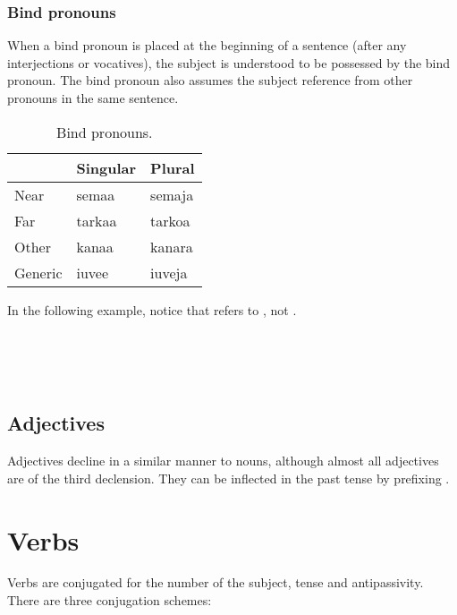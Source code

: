 \documentclass{book}
\begin{document}
\subsection{Bind pronouns}

When a bind pronoun is placed at the beginning of a sentence (after any interjections or vocatives), the subject is understood to be possessed by the bind pronoun. The bind pronoun also assumes the subject reference from other pronouns in the same sentence.

\begin{table}[h]
    \caption{Bind pronouns.}
    \centering
    \begin{tabular}{|l|l|l|}
        \hline
        & Singular & Plural \\
        \hline
        Near & semaa & semaja \\
        Far & tarkaa & tarkoa \\
        Other & kanaa & kanara \\
        Generic & iuvee & iuveja \\
        \hline
    \end{tabular}
\end{table}

In the following example, notice that  refers to , not .

~ \\
     \\
     \\
\emph{    }

\section{Adjectives}

Adjectives decline in a similar manner to nouns, although almost all adjectives are of the third declension. They can be inflected in the past tense by prefixing .

\chapter{Verbs}

Verbs are conjugated for the number of the subject, tense and antipassivity. There are three conjugation schemes:
\end{document}
